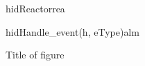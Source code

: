 \documentclass[Main]{subfiles}
\begin{document}
\newpage
\begin{figure}
\begin {sequencediagram}

	\begin{call}{hid}{Reactor}{rea}{}
	\end{call}
	\begin{messcall}{hid}{Handle\_event(h, eType)}{alm}
	\end{messcall}



\end{sequencediagram}

\caption{Title of figure}
\label{fig:alarmEventHandler}
\end{figure}
\end{document}
